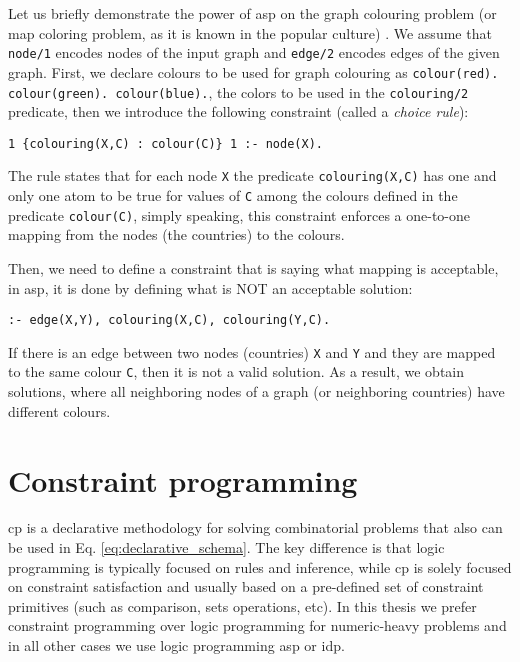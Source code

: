 Let us briefly demonstrate the power of \acrshort{asp} on the graph colouring problem (or map coloring problem, as it is known in the popular culture) \parencite{ASPbook}. We assume that \texttt{node/1} encodes nodes of the input graph and \texttt{edge/2} encodes edges of the given graph. First, we declare colours to be used for graph colouring as \texttt{colour(red). colour(green). colour(blue).}, the colors to be used in the \texttt{colouring/2} predicate, then we introduce the following constraint (called a \textit{choice rule}):
\begin{verbatim}
1 {colouring(X,C) : colour(C)} 1 :- node(X).
\end{verbatim}
The rule states that for each node \texttt{X} the predicate \texttt{colouring(X,C)} has one and only one atom to be true for values of \texttt{C} among the colours defined in the predicate \texttt{colour(C)}, simply speaking, this constraint enforces a one-to-one mapping from the nodes (the countries) to the colours.

Then, we need to define a constraint that is saying what mapping is acceptable, in \acrshort{asp}, it is done by defining what is NOT an acceptable solution:
\begin{verbatim}
:- edge(X,Y), colouring(X,C), colouring(Y,C).
\end{verbatim}
If there is an edge between two nodes (countries) \texttt{X} and \texttt{Y} and they are mapped to the same colour \texttt{C}, then it is not a valid solution. As a result, we obtain solutions, where all neighboring nodes of a graph (or neighboring countries) have different colours.
\pubrevend

\section{Constraint programming} \label{sec:cp_intro}
\pubrev
\acrlong{cp} is a declarative methodology for solving combinatorial
problems that also can be used in Eq. \ref{eq:declarative_schema}. The
key difference is that logic programming is typically focused on rules
and inference, while \acrshort{cp} is solely focused on constraint
satisfaction and usually based on a pre-defined set of constraint
primitives (such as comparison, sets operations, etc). In this thesis
we prefer constraint programming over logic programming for
numeric-heavy problems and in all other cases we use logic programming \acrshort{asp} or \acrshort{idp}.
\pubrevend

